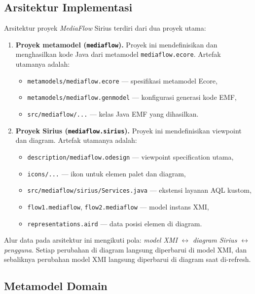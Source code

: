 \subsection{Arsitektur Implementasi}

Arsitektur proyek \textit{MediaFlow} Sirius terdiri dari dua proyek utama:
\begin{enumerate}
  \item \textbf{Proyek metamodel (\texttt{mediaflow}).} Proyek ini mendefinisikan dan menghasilkan kode Java dari metamodel \texttt{mediaflow.ecore}. Artefak utamanya adalah:
    \begin{itemize}
      \item \texttt{metamodels/mediaflow.ecore} --- spesifikasi metamodel Ecore,
      \item \texttt{metamodels/mediaflow.genmodel} --- konfigurasi generasi kode EMF,
      \item \texttt{src/mediaflow/...} --- kelas Java EMF yang dihasilkan.
    \end{itemize}
  \item \textbf{Proyek Sirius (\texttt{mediaflow.sirius}).} Proyek ini mendefinisikan viewpoint dan diagram. Artefak utamanya adalah:
    \begin{itemize}
      \item \texttt{description/mediaflow.odesign} --- viewpoint specification utama,
      \item \texttt{icons/...} --- ikon untuk elemen palet dan diagram,
      \item \texttt{src/mediaflow/sirius/Services.java} --- ekstensi layanan AQL kustom,
      \item \texttt{flow1.mediaflow}, \texttt{flow2.mediaflow} --- model instans XMI,
      \item \texttt{representations.aird} --- data posisi elemen di diagram.
    \end{itemize}
\end{enumerate}

Alur data pada arsitektur ini mengikuti pola: \textit{model XMI} $\leftrightarrow$ \textit{diagram Sirius} $\leftrightarrow$ \textit{pengguna}. Setiap perubahan di diagram langsung diperbarui di model XMI, dan sebaliknya perubahan model XMI langsung diperbarui di diagram saat di-refresh.

\subsection{Metamodel Domain}

